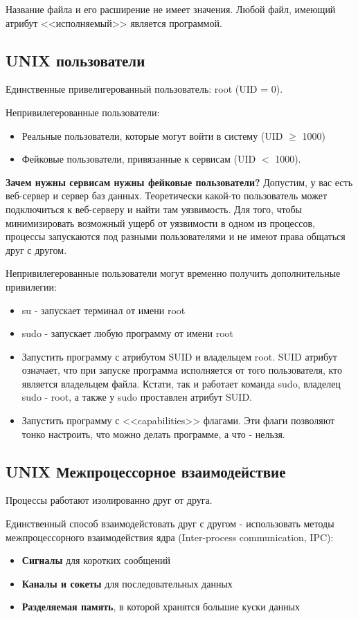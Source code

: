 Название файла и его расширение не имеет значения. Любой файл, имеющий атрибут 
<<исполняемый>> является программой.

\subsection{UNIX пользователи}

Единственные привелигерованный пользователь: root (UID = 0).

Непривилегерованные пользователи:
\begin{itemize}
	\item Реальные пользователи, которые могут войти в систему (UID $\ge$ 1000)
	\item Фейковые пользователи, привязанные к сервисам (UID $<$ 1000).
\end{itemize}

\textbf{Зачем нужны сервисам нужны фейковые пользователи?}
Допустим, у вас есть веб-сервер и сервер баз данных. Теоретически какой-то пользователь
может подключиться к веб-серверу и найти там уязвимость. Для того, чтобы 
минимизировать возможный ущерб от уязвимости в одном из процессов, процессы запускаются
под разными пользователями и не имеют права общаться друг с другом.

Непривилегерованные пользователи могут временно получить 
дополнительные привилегии:
\begin{itemize}
	\item su - запускает терминал от имени root
	\item sudo - запускает любую программу от имени root
	\item Запустить программу с атрибутом SUID и владельцем root. SUID атрибут означает, что при запуске программа
	исполняется от того пользователя, кто является владельцем файла. Кстати, так и 
	работает команда sudo, владелец sudo - root, а также у sudo проставлен атрибут SUID.
	\item Запустить программу с <<capabilities>> флагами. Эти флаги позволяют тонко настроить, что можно делать программе, а что - нельзя.
\end{itemize}

\subsection{UNIX Межпроцессорное взаимодействие}

Процессы работают изолированно друг от друга.

Единственный способ взаимодейстовать друг с другом - использовать методы межпроцессорного взаимодействия ядра (Inter-process communication, IPC):
\begin{itemize}
	\item \textbf{Сигналы} для коротких сообщений
	\item \textbf{Каналы и сокеты} для последовательных данных
	\item \textbf{Разделяемая память}, в которой хранятся большие куски данных
\end{itemize}


